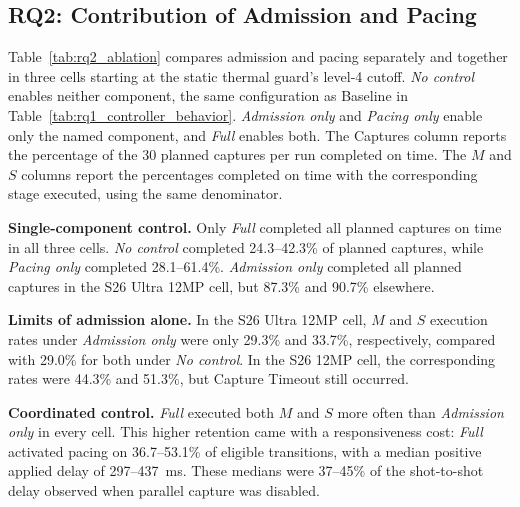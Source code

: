 \subsection{RQ2: Contribution of Admission and Pacing}
\label{sec:rq2}



Table~\ref{tab:rq2_ablation} compares admission and pacing separately and together in three cells starting at the static thermal guard's level-4 cutoff.
\emph{No control} enables neither component, the same configuration as Baseline in Table~\ref{tab:rq1_controller_behavior}.
\emph{Admission only} and \emph{Pacing only} enable only the named component, and \emph{Full} enables both.
The Captures column reports the percentage of the 30 planned captures per run completed on time.
The \(M\) and \(S\) columns report the percentages completed on time with the corresponding stage executed, using the same denominator.

\smallskip\noindent\textbf{Single-component control.}
Only \emph{Full} completed all planned captures on time in all three cells.
\emph{No control} completed \mbox{24.3--42.3\%} of planned captures, while \emph{Pacing only} completed \mbox{28.1--61.4\%}.
\emph{Admission only} completed all planned captures in the S26 Ultra 12MP cell, but 87.3\% and 90.7\% elsewhere.

\smallskip\noindent\textbf{Limits of admission alone.}
In the S26 Ultra 12MP cell, \(M\) and \(S\) execution rates under \emph{Admission only} were only 29.3\% and 33.7\%, respectively, compared with 29.0\% for both under \emph{No control}.
In the S26 12MP cell, the corresponding rates were 44.3\% and 51.3\%, but Capture Timeout still occurred.

\smallskip\noindent\textbf{Coordinated control.}
\emph{Full} executed both \(M\) and \(S\) more often than \emph{Admission only} in every cell.
This higher retention came with a responsiveness cost: \emph{Full} activated pacing on 36.7--53.1\% of eligible transitions, with a median positive applied delay of 297--437~ms.
These medians were 37--45\% of the shot-to-shot delay observed when parallel capture was disabled.
